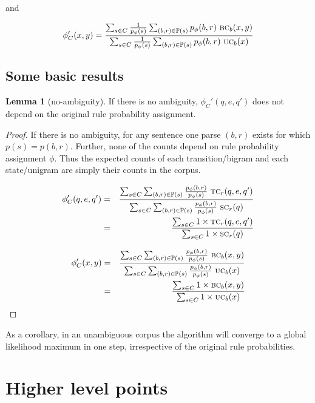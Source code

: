 \documentclass[12pt]{article}
\theoremstyle{definition}
\newtheorem{lemma}{Lemma}[section]
\begin{document}
and 

$$\phi_C'(x,y) = \frac{\sum_{s\in C}\frac{1}{p_\phi(s)}\sum_{(b,r)\in\mathbb{P}(s)} p_\phi(b,r)~ \text{\textsc{bc}}_b(x,y)}{\sum_{s\in C}\frac{1}{p_\phi(s)}\sum_{(b,r)\in\mathbb{P}(s)} p_\phi(b,r)~ \text{\textsc{uc}}_b(x)}$$ 





\subsection{Some basic results}

\begin{lemma}[no-ambiguity]
  If there is no ambiguity, $\phi_C'(q,e,q')$ does not depend on the original rule probability assignment.
\end{lemma}

\begin{proof}
  If there is no ambiguity, for any sentence one parse $(b,r)$ exists for which $p(s)=p(b,r)$. Further, none of the counts depend on rule probability assignment $\phi$. Thus the expected counts of each transition/bigram and each state/unigram are simply their counts in the corpus.

  \begin{eqnarray*}
    \phi_C'(q,e,q')& = &\frac{\sum_{s\in C}\sum_{(b,r)\in\mathbb{P}(s)} \frac{p_\phi(b,r)}{p_\phi(s)}~ \text{\textsc{tc}}_r(q,e,q')}{\sum_{s\in C}\sum_{(b,r)\in\mathbb{P}(s)} \frac{p_\phi(b,r)}{p_\phi(s)}~ \text{\textsc{sc}}_r(q)}\\
    & = &\frac{\sum_{s\in C} 1 \times \text{\textsc{tc}}_r(q,e,q')}{\sum_{s\in C} 1 \times \text{\textsc{sc}}_r(q)}
  \end{eqnarray*}

  \begin{eqnarray*}
    \phi_C'(x,y)& = &\frac{\sum_{s\in C}\sum_{(b,r)\in\mathbb{P}(s)} \frac{p_\phi(b,r)}{p_\phi(s)}~ \text{\textsc{bc}}_b(x,y)}{\sum_{s\in C}\sum_{(b,r)\in\mathbb{P}(s)} \frac{p_\phi(b,r)}{p_\phi(s)}~ \text{\textsc{uc}}_b(x)}\\
    & = &\frac{\sum_{s\in C} 1 \times \text{\textsc{bc}}_b(x,y)}{\sum_{s\in C} 1 \times \text{\textsc{uc}}_b(x)}
  \end{eqnarray*}


\end{proof}

As a corollary, in an unambiguous corpus the algorithm will converge to a global likelihood maximum in one step, irrespective of the original rule probabilities.



\section{Higher level points}
\label{sec:higher-level-points}
\end{document}
